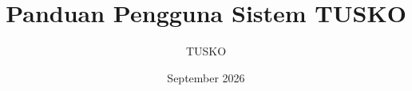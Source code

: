 \newcommand{\DocTitle}{Panduan Pengguna Sistem TUSKO}
\newcommand{\DocSubtitle}{E-Commerce Olahraga dan ERP Terintegrasi}
\newcommand{\DocVersion}{v1.0}
\newcommand{\DocDate}{September 2026}
\newcommand{\DocOrg}{TUSKO}
\title{\DocTitle}
\author{\DocOrg}
\date{\DocDate}
